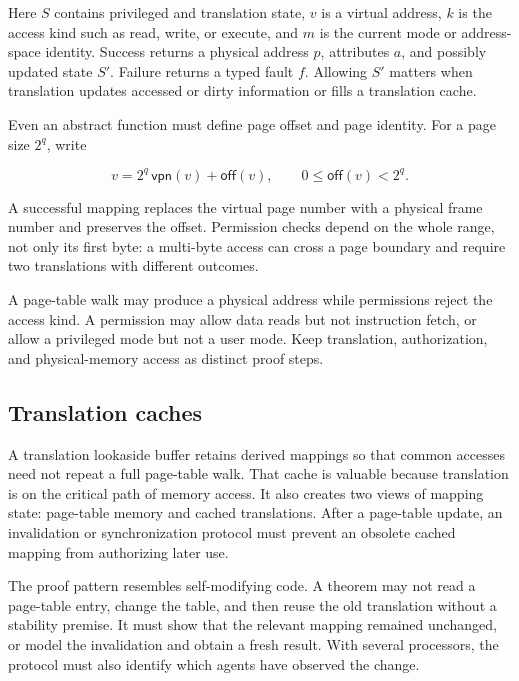 Here \(S\) contains privileged and translation state, \(v\) is a virtual
address, \(k\) is the access kind such as read, write, or execute, and \(m\) is
the current mode or address-space identity. Success returns a physical address
\(p\), attributes \(a\), and possibly updated state \(S'\). Failure returns a
typed fault \(f\). Allowing \(S'\) matters when translation updates accessed
or dirty information or fills a translation cache.

Even an abstract function must define page offset and page identity. For a page
size \(2^q\), write

\[
  v=2^q\,\mathsf{vpn}(v)+\mathsf{off}(v),
  \qquad 0\leq\mathsf{off}(v)<2^q.
\]

A successful mapping replaces the virtual page number with a physical frame
number and preserves the offset. Permission checks depend on the whole range,
not only its first byte: a multi-byte access can cross a page boundary and
require two translations with different outcomes.

\begin{warning}[title={A translated address is not yet an authorized access}]
A page-table walk may produce a physical address while permissions reject the
access kind. A permission may allow data reads but not instruction fetch, or
allow a privileged mode but not a user mode. Keep translation, authorization,
and physical-memory access as distinct proof steps.
\end{warning}

\subsection{Translation caches}

A translation lookaside buffer retains derived mappings so that common
accesses need not repeat a full page-table walk. That cache is valuable because
translation is on the critical path of memory access. It also creates two
views of mapping state: page-table memory and cached translations. After a
page-table update, an invalidation or synchronization protocol must prevent an
obsolete cached mapping from authorizing later use.

The proof pattern resembles self-modifying code. A theorem may not read a
page-table entry, change the table, and then reuse the old translation without
a stability premise. It must show that the relevant mapping remained
unchanged, or model the invalidation and obtain a fresh result. With several
processors, the protocol must also identify which agents have observed the
change.

